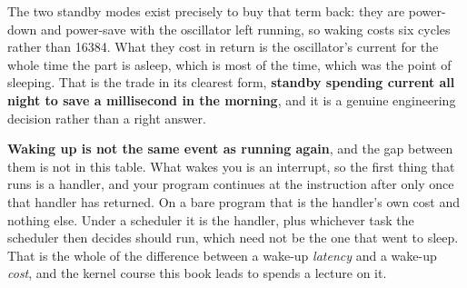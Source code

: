 The two standby modes exist precisely to buy that term back: they are power-down and power-save
with the oscillator left running, so waking costs six cycles rather than 16384. What they cost in
return is the oscillator's current for the whole time the part is asleep, which is most of the
time, which was the point of sleeping. That is the trade in its clearest form, \textbf{standby
spending current all night to save a millisecond in the morning}, and it is a genuine engineering
decision rather than a right answer.

\textbf{Waking up is not the same event as running again}, and the gap between them is not in this
table. What wakes you is an interrupt, so the first thing that runs is a handler, and your program
continues at the instruction after  only once that handler has returned. On a bare
program that is the handler's own cost and nothing else. Under a scheduler it is the handler, plus
whichever task the scheduler then decides should run, which need not be the one that went to
sleep. That is the whole of the difference between a wake-up \emph{latency} and a wake-up
\emph{cost}, and the kernel course this book leads to spends a lecture on it.
